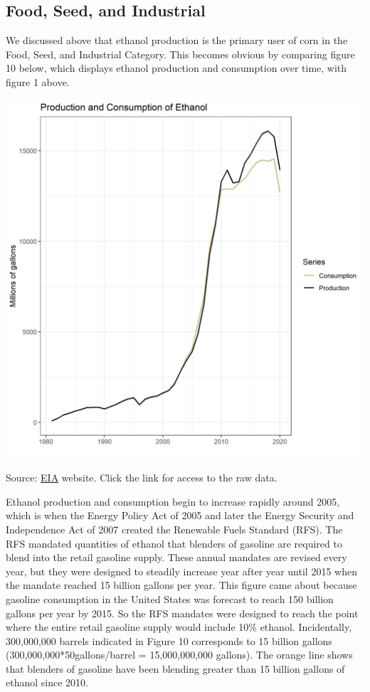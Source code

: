 \documentclass[
]{book}
\begin{document}
\hypertarget{food-seed-and-industrial}{%
\subsection{Food, Seed, and Industrial}\label{food-seed-and-industrial}}

We discussed above that ethanol production is the primary user of corn
in the Food, Seed, and Industrial Category. This becomes obvious by
comparing figure 10 below, which displays ethanol production and
consumption over time, with figure 1 above.

\includegraphics{assets/ForecastingUseof-Ethanol.png}

Source: \href{http://www.eia.gov/totalenergy/data/monthly/\#renewable}{EIA}
website. Click the link for access to the raw data.

Ethanol production and consumption begin to increase rapidly around
2005, which is when the Energy Policy Act of 2005 and later the Energy
Security and Independence Act of 2007 created the Renewable Fuels
Standard (RFS). The RFS mandated quantities of ethanol that blenders of
gasoline are required to blend into the retail gasoline supply. These
annual mandates are revised every year, but they were designed to
steadily increase year after year until 2015 when the mandate reached 15
billion gallons per year. This figure came about because gasoline
consumption in the United States was forecast to reach 150 billion
gallons per year by 2015. So the RFS mandates were designed to reach the
point where the entire retail gasoline supply would include 10\% ethanol.
Incidentally, 300,000,000 barrels indicated in Figure 10 corresponds to
15 billion gallons (300,000,000*50gallons/barrel = 15,000,000,000
gallons). The orange line shows that blenders of gasoline have been
blending greater than 15 billion gallons of ethanol since 2010.
\end{document}
